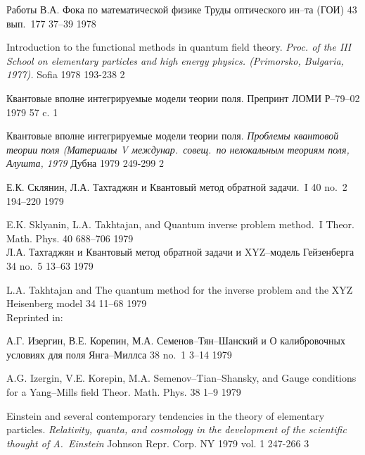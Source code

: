 {\LD}
{Работы В.А. Фока по математической физике}
{Труды оптического ин--та (ГОИ)} {43} {вып.~177} {37--39} {1978}

{\LF} 
{Introduction to the functional methods in quantum field theory.} 
{\em Proc. of the III School on elementary particles and
 high energy physics. (Primorsko, Bulgaria, 1977).}
{} {Sofia} {1978} {} {193-238} {2}

{\LD}
{Квантовые вполне интегрируемые модели теории поля.} 
{Препринт ЛОМИ Р--79--02} {} {} {1979} {} {57 c.} {1}

{\LD}
{Квантовые вполне интегрируемые модели теории поля.} 
{\em Проблемы квантовой теории поля
(Материалы V междунар.\ совещ.\ по нелокальным теориям поля,
  Алушта, 1979} {} {Дубна} {1979} {} {249-299} {2}


{Е.К. Склянин,  Л.А. Тахтаджян и \LD}
{Квантовый метод обратной задачи.~I}
{\TMF} {40} {no.~2} {194--220} {1979}

{E.K. Sklyanin, L.A. Takhtajan, and \LF}
{Quantum inverse problem method.~I}
{Theor. Math. Phys.} {40} {688--706} {1979} \\

{Л.А. Тахтаджян и \LD}
{Квантовый метод обратной задачи и XYZ--модель Гейзенберга}
{\UMN} {34} {no.~5} {13--63} {1979}

{L.A. Takhtajan and \LF}
{The quantum method for the inverse problem and the XYZ
  Heisenberg model}
{\RMS} {34} {11--68} {1979} \\

Reprinted in: \fy{}

{А.Г. Изергин, В.Е. Корепин, М.А. Семенов--Тян--Шанский и \LD}
{О калибровочных условиях для поля Янга--Миллса}
{\TMF} {38} {no.~1} {3--14} {1979}

{A.G. Izergin, V.E. Korepin, M.A. Semenov--Tian--Shansky, and \LF}
{Gauge conditions for a Yang--Mills field}
{Theor. Math. Phys.} {38} {1--9} {1979}

{\LF} 
{Einstein and several contemporary tendencies in the theory
of elementary particles.} 
{\em Relativity, quanta, and cosmology in the development
of the scientific thought of A.~Einstein}
{Johnson Repr. Corp.} {NY} {1979} {vol. 1}  {247-266} {3}

